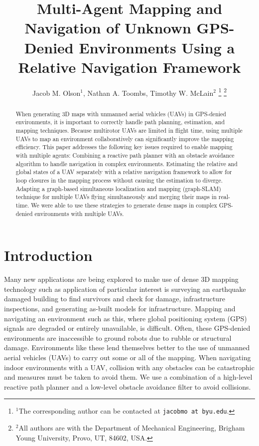 \documentclass[letterpaper, 10 pt, conference]{ieeeconf}  %
\title{\LARGE \bf
Multi-Agent Mapping and Navigation of Unknown GPS-Denied Environments Using a Relative Navigation Framework}
\author{Jacob M. Olson$^{1}$, Nathan A. Toombs, Timothy W. McLain$^{2}$%
\thanks{$^{1}$The corresponding author can be contacted at
        {\tt\small jacobmo at byu.edu}.}%
\thanks{$^{2}$All authors are with the Department of Mechanical Engineering,
        Brigham Young University, Provo, UT, 84602, USA.}%
}
\begin{document}
\maketitle
\thispagestyle{empty}
\pagestyle{empty}


\begin{abstract}

When generating 3D maps with unmanned aerial vehicles (UAVs) in GPS-denied environments, it is important to correctly handle path planning, estimation, and mapping techniques. Because multirotor UAVs are limited in flight time, using multiple UAVs to map an environment collaboratively can significantly improve the mapping efficiency. This paper addresses the following key issues required to enable mapping with multiple agents: Combining a reactive path planner with an obstacle avoidance algorithm to handle navigation in complex environments. Estimating the relative and global states of a UAV separately with a relative navigation framework to allow for loop closures in the mapping process without causing the estimation to diverge. Adapting a graph-based simultaneous localization and mapping (graph-SLAM) technique for multiple UAVs flying simultaneously and merging their maps in real-time. We were able to use these strategies to generate dense maps in complex GPS-denied environments with multiple UAVs.

\end{abstract}

\section{Introduction}

Many new applications are being explored to make use of dense 3D mapping technology such as application of particular interest is surveying an earthquake damaged building to find survivors and check for damage, infrastructure inspections, and generating as-built models for infrastructure. Mapping and navigating an environment such as this, where global positioning system (GPS) signals are degraded or entirely unavailable, is difficult. Often, these GPS-denied environments are inaccessible to ground robots due to rubble or structural damage. Environments like these lend themselves better to the use of unmanned aerial vehicles (UAVs) to carry out some or all of the mapping. When navigating indoor environments with a UAV, collision with any obstacles can be catastrophic and measures must be taken to avoid them. We use a combination of a high-level reactive path planner and a low-level obstacle avoidance filter to avoid collisions.
\end{document}
